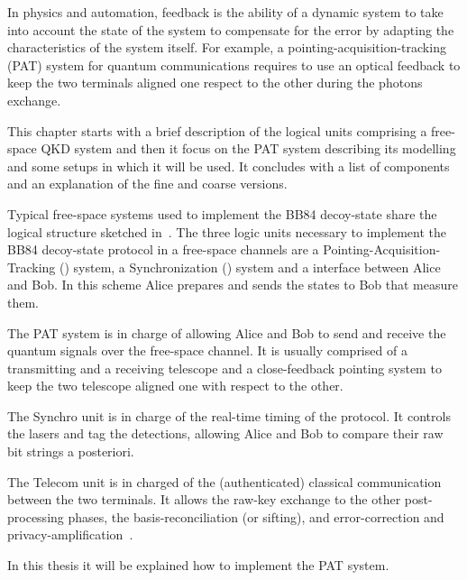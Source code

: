 In physics and automation, feedback is the ability of a dynamic system to take into account the state of the system to compensate for the error by adapting the characteristics of the system itself.
For example, a pointing-acquisition-tracking (PAT) system for quantum communications requires to use an optical feedback to keep the two terminals aligned one respect to the other during the photons exchange.

This chapter starts with a brief description of the logical units comprising a free-space QKD system and then it focus on the PAT system describing its modelling and some setups in which it will be used. It concludes with a list of components and an explanation of the fine and coarse versions.


\newpage

Typical free-space systems used to implement the BB84 decoy-state share the logical structure sketched in~. The three logic units necessary to implement the BB84 decoy-state protocol in a free-space channels are a Pointing-Acquisition-Tracking () system, a Synchronization () system and a  interface between Alice and Bob. In this scheme  Alice prepares and sends the states to Bob that measure them.

The PAT system is in charge of allowing Alice and Bob to send and receive the quantum signals over the free-space channel. It is usually comprised of a transmitting and a receiving telescope and a close-feedback pointing system to keep the two telescope aligned one with respect to the other.

The Synchro unit is in charge of the real-time timing of the protocol. It controls the lasers and tag the detections, allowing Alice and Bob to compare their raw bit strings a posteriori.

The Telecom unit is in charged of the (authenticated) classical communication between the two terminals. It allows the raw-key exchange to the other post-processing phases, the basis-reconciliation (or sifting), and error-correction and privacy-amplification~\cite{a9}.

In this thesis it will be explained how to implement the PAT system.

